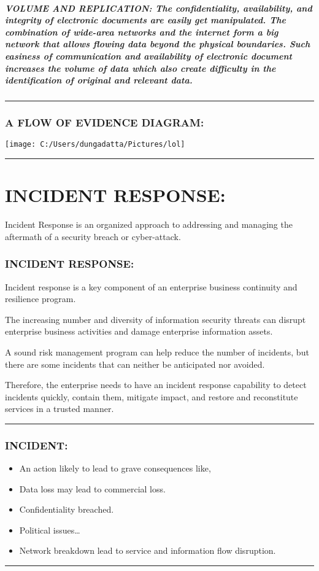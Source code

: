 \documentclass[10pt,british,english]{article}
\begin{document}
\subsubsection{VOLUME AND REPLICATION: The confidentiality, availability, and integrity
of electronic documents are easily get manipulated. The combination
of wide-area networks and the internet form a big network that allows
flowing data beyond the physical boundaries. Such easiness of communication
and availability of electronic document increases the volume of data
which also create difficulty in the identification of original and
relevant data.}

\rule[0.5ex]{1\columnwidth}{1pt}

\section{A FLOW OF EVIDENCE DIAGRAM:}

\texttt{[image: C:/Users/dungadatta/Pictures/lol]}

\rule[0.5ex]{1\columnwidth}{1pt}

\part{INCIDENT RESPONSE: }

Incident Response is an organized approach to addressing and managing
the aftermath of a security breach or cyber-attack.

\section{INCIDENT RESPONSE:}

Incident response is a key component of an enterprise business continuity
and resilience program. 

The increasing number and diversity of information security threats
can disrupt enterprise business activities and damage enterprise information
assets. 

A sound risk management program can help reduce the number of incidents,
but there are some incidents that can neither be anticipated nor avoided. 

Therefore, the enterprise needs to have an incident response capability
to detect incidents quickly, contain them, mitigate impact, and restore
and reconstitute services in a trusted manner.

\rule[0.5ex]{1\columnwidth}{1pt}

\section{INCIDENT: }
\begin{itemize}
\item An action likely to lead to grave consequences like,
\item Data loss may lead to commercial loss.
\item Confidentiality breached.
\item Political issues\dots{}
\item Network breakdown lead to service and information flow disruption.
\end{itemize}
\rule[0.5ex]{1\columnwidth}{1pt}
\end{document}
